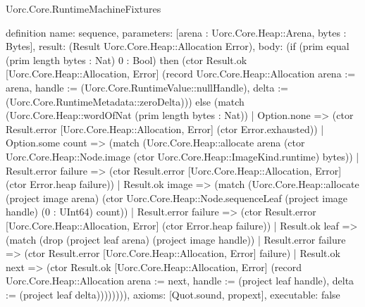 \begin{lexlean}{Uorc.Core.RuntimeMachineFixtures}
\begin{semanticmodule}
definition{
  name: sequence,
  parameters: [arena : Uorc.Core.Heap::Arena, bytes : Bytes],
  result: (Result Uorc.Core.Heap::Allocation Error),
  body: (if (prim equal (prim length bytes : Nat) 0 : Bool) then (ctor Result.ok [Uorc.Core.Heap::Allocation, Error] (record Uorc.Core.Heap::Allocation {arena := arena, handle := (Uorc.Core.RuntimeValue::nullHandle), delta := (Uorc.Core.RuntimeMetadata::zeroDelta)})) else (match (Uorc.Core.Heap::wordOfNat (prim length bytes : Nat))
    | Option.none => (ctor Result.error [Uorc.Core.Heap::Allocation, Error] (ctor Error.exhausted))
    | Option.some count => (match (Uorc.Core.Heap::allocate arena (ctor Uorc.Core.Heap::Node.image (ctor Uorc.Core.Heap::ImageKind.runtime) bytes))
      | Result.error failure => (ctor Result.error [Uorc.Core.Heap::Allocation, Error] (ctor Error.heap failure))
      | Result.ok image => (match (Uorc.Core.Heap::allocate (project image arena) (ctor Uorc.Core.Heap::Node.sequenceLeaf (project image handle) (0 : UInt64) count))
        | Result.error failure => (ctor Result.error [Uorc.Core.Heap::Allocation, Error] (ctor Error.heap failure))
        | Result.ok leaf => (match (drop (project leaf arena) (project image handle))
          | Result.error failure => (ctor Result.error [Uorc.Core.Heap::Allocation, Error] failure)
          | Result.ok next => (ctor Result.ok [Uorc.Core.Heap::Allocation, Error] (record Uorc.Core.Heap::Allocation {arena := next, handle := (project leaf handle), delta := (project leaf delta)}))))))),
  axioms: [Quot.sound, propext],
  executable: false
}


\end{semanticmodule}
\end{lexlean}
